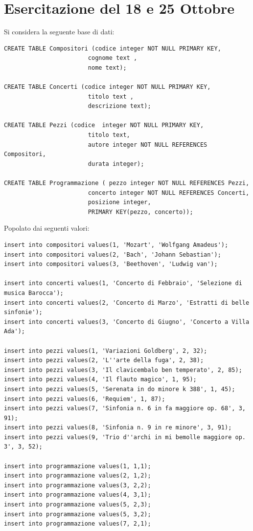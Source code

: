 \documentclass{article}
\numberwithin{equation}{subsection}
\begin{document}
\clearpage

\section{Esercitazione del 18 e 25 Ottobre}


Si considera la seguente base di dati:
\begin{verbatim}
CREATE TABLE Compositori (codice integer NOT NULL PRIMARY KEY,
                        cognome text ,
                        nome text);
						
CREATE TABLE Concerti (codice integer NOT NULL PRIMARY KEY,
                        titolo text ,
                        descrizione text);

CREATE TABLE Pezzi (codice  integer NOT NULL PRIMARY KEY,
                        titolo text,
                        autore integer NOT NULL REFERENCES Compositori,
                        durata integer);

CREATE TABLE Programmazione ( pezzo integer NOT NULL REFERENCES Pezzi,
                        concerto integer NOT NULL REFERENCES Concerti, 
                        posizione integer,
                        PRIMARY KEY(pezzo, concerto));

\end{verbatim}

Popolato dai seguenti valori:
\begin{verbatim}
insert into compositori values(1, 'Mozart', 'Wolfgang Amadeus');
insert into compositori values(2, 'Bach', 'Johann Sebastian');
insert into compositori values(3, 'Beethoven', 'Ludwig van');

insert into concerti values(1, 'Concerto di Febbraio', 'Selezione di musica Barocca');
insert into concerti values(2, 'Concerto di Marzo', 'Estratti di belle sinfonie');
insert into concerti values(3, 'Concerto di Giugno', 'Concerto a Villa Ada');

insert into pezzi values(1, 'Variazioni Goldberg', 2, 32);
insert into pezzi values(2, 'L''arte della fuga', 2, 38);
insert into pezzi values(3, 'Il clavicembalo ben temperato', 2, 85);
insert into pezzi values(4, 'Il flauto magico', 1, 95);
insert into pezzi values(5, 'Serenata in do minore k 388', 1, 45);
insert into pezzi values(6, 'Requiem', 1, 87);
insert into pezzi values(7, 'Sinfonia n. 6 in fa maggiore op. 68', 3, 91);
insert into pezzi values(8, 'Sinfonia n. 9 in re minore', 3, 91);
insert into pezzi values(9, 'Trio d''archi in mi bemolle maggiore op. 3', 3, 52);

insert into programmazione values(1, 1,1);
insert into programmazione values(2, 1,2);
insert into programmazione values(3, 2,2);
insert into programmazione values(4, 3,1);
insert into programmazione values(5, 2,3);
insert into programmazione values(5, 3,2);
insert into programmazione values(7, 2,1);
\end{verbatim}
\end{document}
